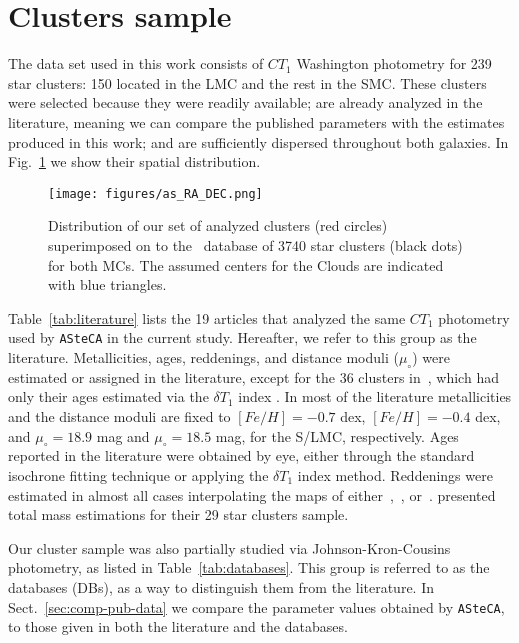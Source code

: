 \documentclass{aa}
\begin{document}

\section{Clusters sample}
\label{sec:clust-sample}

The data set used in this work consists of $CT_1$ Washington photometry for 239
star clusters: 150 located in the LMC and the rest in the SMC.\@
%
These clusters were selected because they were readily available; are
already analyzed in the literature, meaning we can compare the published
parameters with the estimates produced in this work; and are sufficiently
dispersed throughout both galaxies. In Fig.~\ref{fig:ra-dec} we show their
spatial distribution.

\begin{figure}
\centering
\texttt{[image: figures/as\_RA\_DEC.png]}
\caption{Distribution of our set of analyzed clusters (red circles)
superimposed on to the~\cite{Bica_2008} database of 3740 star clusters (black
dots) for both MCs. The assumed centers for the Clouds are indicated with blue
triangles.}
\label{fig:ra-dec}
\end{figure}

Table~\ref{tab:literature} lists the 19 articles that analyzed the same
$CT_1$ photometry used by \texttt{ASteCA} in the current study. Hereafter, we
refer to this group as the literature.
%
Metallicities, ages, reddenings, and distance moduli ($\mu_{\circ}$)
were estimated or assigned in the literature, except for the 36
clusters in~\cite{Piatti_2011b}, which had only their ages estimated
via the $\delta T_1$ index \citep{Phelps_1994,Geisler_1997}.
%
In most of the literature metallicities and the distance moduli are fixed to
$[Fe/H]{=}-0.7$ dex, $[Fe/H]{=}-0.4$ dex, and $\mu_{\circ}{=}18.9$ mag and
$\mu_{\circ}{=}18.5$ mag, for the S/LMC, respectively.
Ages reported in the literature were obtained by eye, either through
the standard isochrone fitting technique or applying the $\delta T_1$ index
method.
Reddenings were estimated in almost all cases interpolating the maps
of either~\cite{Burstein_1982},~\cite{Schlegel_1998}, or~\cite{Haschke_2011}.
\cite{Maia_2013} presented total mass estimations for their 29 star clusters
sample.

Our cluster sample was also partially studied via Johnson-Kron-Cousins
photometry, as listed in Table~\ref{tab:databases}. This group is referred
to as the databases (DBs), as a way to distinguish them from the
literature. In Sect.~\ref{sec:comp-pub-data} we compare the parameter
values obtained by \texttt{ASteCA}, to those given in both the literature and
the databases.
\end{document}
